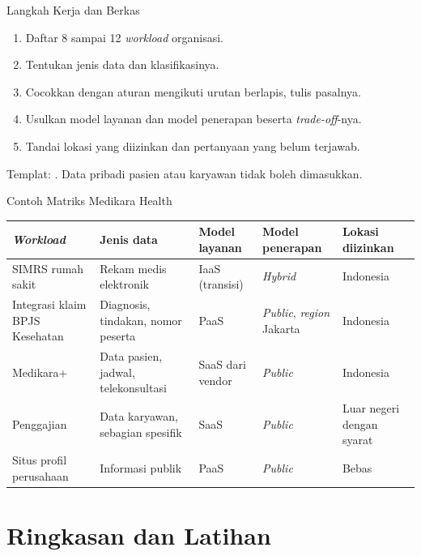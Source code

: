 \documentclass[aspectratio=169, table, 12pt]{beamer}
\begin{document}
\begin{frame}{Langkah Kerja dan Berkas}
  \small
  \begin{enumerate}
    \item Daftar 8 sampai 12 \textit{workload} organisasi.
    \item Tentukan jenis data dan klasifikasinya.
    \item Cocokkan dengan aturan mengikuti urutan berlapis, tulis pasalnya.
    \item Usulkan model layanan dan model penerapan beserta \textit{trade-off}-nya.
    \item Tandai lokasi yang diizinkan dan pertanyaan yang belum terjawab.
  \end{enumerate}
  \vspace{4pt}
  {\footnotesize Templat: .
  Data pribadi pasien atau karyawan tidak boleh dimasukkan.}
\end{frame}

\begin{frame}{Contoh Matriks Medikara Health}
  \footnotesize
  \begin{tabularx}{\textwidth}{>{\raggedright\arraybackslash}p{2.6cm}
      >{\raggedright\arraybackslash}X >{\raggedright\arraybackslash}p{1.9cm}
      >{\raggedright\arraybackslash}p{2.6cm} >{\raggedright\arraybackslash}p{2.4cm}}
    \hline
    \textbf{\textit{Workload}} & \textbf{Jenis data} & \textbf{Model layanan} &
      \textbf{Model penerapan} & \textbf{Lokasi diizinkan} \\
    \hline
    SIMRS rumah sakit & Rekam medis elektronik & IaaS (transisi) & \textit{Hybrid} &
      Indonesia \\
    \hline
    Integrasi klaim BPJS Kesehatan & Diagnosis, tindakan, nomor peserta & PaaS &
      \textit{Public}, \textit{region} Jakarta & Indonesia \\
    \hline
    Medikara+ & Data pasien, jadwal, telekonsultasi & SaaS dari vendor & \textit{Public} &
      Indonesia \\
    \hline
    Penggajian & Data karyawan, sebagian spesifik & SaaS & \textit{Public} & Luar negeri
      dengan syarat \\
    \hline
    Situs profil perusahaan & Informasi publik & PaaS & \textit{Public} & Bebas \\
    \hline
  \end{tabularx}
\end{frame}

\section{Ringkasan dan Latihan}
\end{document}
